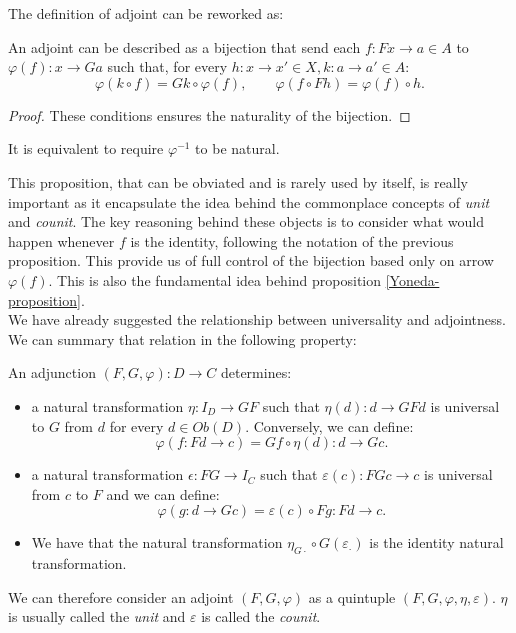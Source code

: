 The definition of adjoint can be reworked as:
\begin{proposition}\label{description:adjoint}
  An adjoint can be described as a bijection that send each $f:Fx\to a\in A$ to $\varphi(f):x\to Ga$ such that, for every $h:x\to x'\in X, k: a\to a'\in A$:
  $$\varphi(k\circ f) = Gk \circ \varphi(f), \qquad \varphi(f\circ Fh) = \varphi(f)\circ h.$$
\end{proposition}
\begin{proof}
These conditions ensures the naturality of the bijection.
\end{proof}
\begin{remark}
  It is equivalent to require $\varphi^{-1}$ to be natural.
\end{remark}

This proposition, that can be obviated and is rarely used by itself, is really important as it encapsulate the idea behind the commonplace concepts of \emph{unit} and \emph{counit}. The key reasoning behind these objects is to consider what would happen whenever $f$ is the identity, following the notation of the previous proposition. This provide us of full control of the bijection based only on arrow $\varphi(f)$. This is also the fundamental idea behind proposition \ref{Yoneda-proposition}.\\

We have already suggested the relationship between universality and adjointness. We can summary that relation in the following property:
\begin{proposition}\label{prop:univAdjoint}
  An adjunction $(F,G,\varphi): D\to C $ determines:
  \begin{itemize}
  \item a natural transformation $\eta: I_D \to GF$ such that $\eta(d):d\to GFd$ is universal to $G$ from $d$ for every $d\in Ob(D)$. Conversely, we can define:
    $$\varphi(f:Fd\to c) = Gf\circ \eta(d): d\to G c.$$
  \item a natural transformation $\epsilon: FG\to I_C$ such that $\varepsilon(c):FGc\to c$ is universal from $c$ to $F$ and we can define:
    $$\varphi(g:d\to Gc) = \varepsilon(c)\circ Fg: Fd\to c.$$
\item We have that the natural transformation $\eta_{G\cdot} \circ G(\varepsilon_\cdot)$ is the identity natural transformation.
  \end{itemize}
\end{proposition}
\begin{remark}
  We can therefore consider an adjoint $(F,G,\varphi)$ as a quintuple  $(F,G,\varphi,\eta,\varepsilon)$. $\eta$ is usually called the \emph{unit} and $\varepsilon$ is called the \emph{counit}.
\end{remark}


